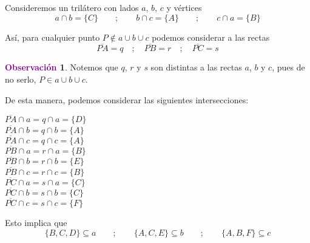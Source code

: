 \documentclass[12pt]{book}
\theoremstyle{definition}
\newtheorem{obs}[teo]{\textcolor{purple}{Observación}}
\begin{document}
Consideremos un trilátero con lados $a$, $b$, $c$ y vértices
$$a \cap b =\{C\} \qquad ; \qquad b \cap c = \{A\} \qquad ; \qquad c \cap a = \{B\}$$

Así, para cualquier punto $P \notin a \cup b \cup c$ podemos considerar a las rectas
$$\overline{PA} = q \quad ; \quad \overline{PB} = r\quad ; \quad \overline{PC} = s$$

\begin{obs}
Notemos que $q$, $r$ y $s$ son distintas a las rectas $a$, $b$ y $c$, pues de no serlo, $P \in a \cup b \cup c$.
\end{obs}

\newpage

De esta manera, podemos considerar las siguientes intersecciones:
\begin{center}
\begin{multicols}{3}
$\overline{PA} \cap a = q \cap a = \{D\}$\\
$\overline{PA} \cap b = q \cap b = \{A\}$\\
$\overline{PA} \cap c = q \cap c = \{A\}$\\
$\overline{PB} \cap a = r \cap a = \{B\}$\\
$\overline{PB} \cap b = r \cap b = \{E\}$\\
$\overline{PB} \cap c = r \cap c = \{B\}$\\
$\overline{PC} \cap a = s \cap a = \{C\}$\\
$\overline{PC} \cap b = s \cap b = \{C\}$\\
$\overline{PC} \cap c = s \cap c = \{F\}$
\end{multicols}
\end{center}

Esto implica que
$$ \{B,C,D\}\subseteq a \qquad ; \qquad \{A,C,E\} \subseteq b \qquad ; \qquad \{A,B,F\} \subseteq c$$
\end{document}
